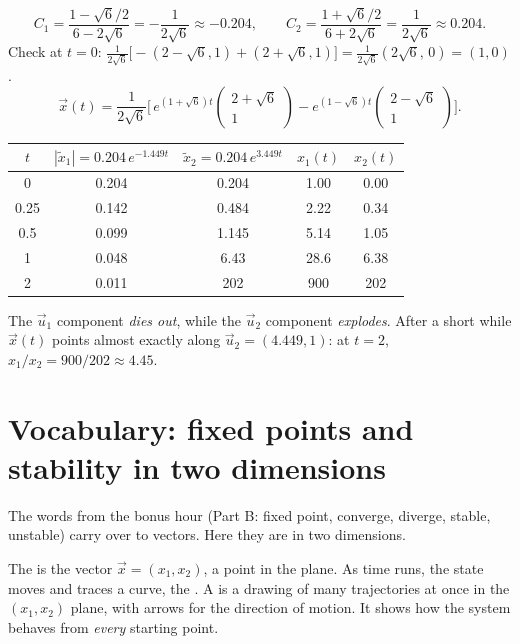 \begin{example}[Start at $\vec x(0) = (1,0)$]
\[ C_1 = \frac{1-\sqrt6/2}{6-2\sqrt6} = -\frac{1}{2\sqrt6}\approx-0.204,\qquad C_2 = \frac{1+\sqrt6/2}{6+2\sqrt6} = \frac{1}{2\sqrt6}\approx 0.204. \]
Check at $t=0$: $\frac{1}{2\sqrt6}\big[-(2-\sqrt6,1)+(2+\sqrt6,1)\big] = \frac{1}{2\sqrt6}(2\sqrt6,\,0) = (1,0)$. \checkmark
\[ \vec x(t) = \frac{1}{2\sqrt6}\Big[\,e^{(1+\sqrt6)t}\begin{pmatrix}2+\sqrt6\\1\end{pmatrix} - e^{(1-\sqrt6)t}\begin{pmatrix}2-\sqrt6\\1\end{pmatrix}\Big]. \]
\begin{center}
\renewcommand{\arraystretch}{1.2}
\begin{tabular}{c|cc|cc}
$t$ & $|\tilde x_1| = 0.204\,e^{-1.449t}$ & $\tilde x_2 = 0.204\,e^{3.449t}$ & $x_1(t)$ & $x_2(t)$\\\hline
0 & 0.204 & 0.204 & 1.00 & 0.00\\
0.25 & 0.142 & 0.484 & 2.22 & 0.34\\
0.5 & 0.099 & 1.145 & 5.14 & 1.05\\
1 & 0.048 & 6.43 & 28.6 & 6.38\\
2 & 0.011 & 202 & 900 & 202\\
\end{tabular}
\end{center}
The $\vec u_1$ component \emph{dies out}, while the $\vec u_2$ component \emph{explodes}. After a short while $\vec x(t)$ points almost exactly along
$\vec u_2 = (4.449,1)$: at $t=2$, $x_1/x_2 = 900/202 \approx 4.45$.
\end{example}

\section{Vocabulary: fixed points and stability in two dimensions}

The words from the bonus hour (Part B: fixed point, converge, diverge, stable, unstable) carry over to vectors. Here they are in two dimensions.

\begin{defn}
The  is the vector $\vec x=(x_1,x_2)$, a point in the plane. As time runs, the state moves and traces a curve, the .
A  is a drawing of many trajectories at once in the $(x_1,x_2)$ plane, with arrows for the direction of motion.
It shows how the system behaves from \emph{every} starting point.
\end{defn}

